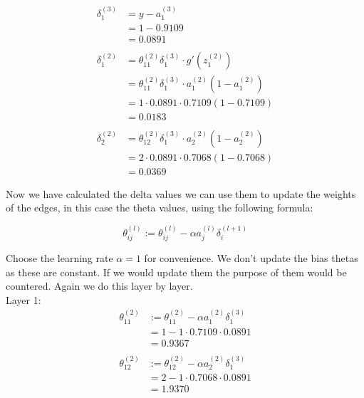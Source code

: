 \documentclass{article}
\begin{document}
\begin{align*}
\delta_1^{(3)} &= y - a_1^{(3)} \\
&= 1 - 0.9109 \\
&= 0.0891 \\
\\
\delta_1^{(2)} &= \theta^{(2)}_{11}\delta_1^{(3)}\cdot g'(z_1^{(2)})\\
&=  \theta^{(2)}_{11}\delta_1^{(3)} \cdot a_1^{(2)}(1- a_1^{(2)})\\
&= 1 \cdot 0.0891 \cdot 0.7109 (1 - 0.7109) \\
&= 0.0183 \\
\\
\delta_2^{(2)} &= \theta_{12}^{(2)} \delta_1^{(3)} \cdot a_2^{(2)}(1-a_2^{(2)}) \\
&= 2 \cdot 0.0891 \cdot 0.7068 ( 1 - 0.7068) \\
&= 0.0369
\end{align*}

Now we have calculated the delta values we can use them to update the weights of the edges, in this case the theta values, using the following formula:

\begin{equation*}
\theta_{ij}^{(l)} := \theta_{ij}^{(l)} - \alpha a_j^{(l)} \delta_i^{(l+1)}
\end{equation*}
 
Choose the learning rate $\alpha = 1$ for convenience. We don't update the bias thetas as these are constant. If we would update them the purpose of them would be countered. Again we do this layer by layer. \\

Layer 1: 
\begin{align*}
\theta_{11}^{(2)} &:= \theta_{11}^{(2)} - \alpha a_1^{(2)} \delta_1^{(3)} \\
&= 1 -  1 \cdot 0.7109 \cdot 0.0891 \\
&= 0.9367 \\
\\
\theta_{12}^{(2)} &:= \theta_{12}^{(2)} - \alpha a_2^{(2)} \delta_1^{(3)}  \\
&= 2 - 1 \cdot 0.7068 \cdot 0.0891 \\
&= 1.9370
\end{align*}
\end{document}
